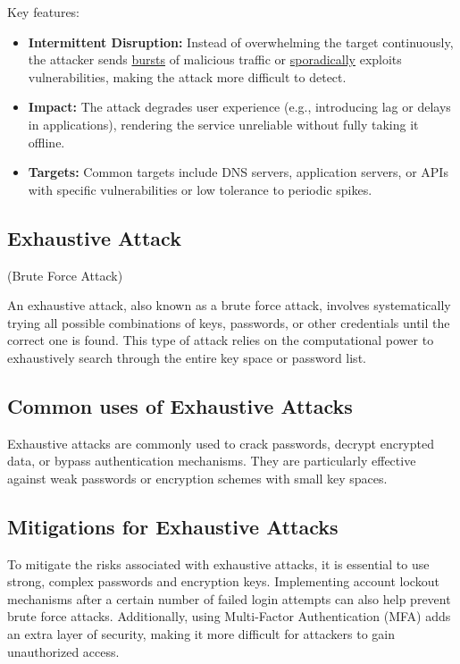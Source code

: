 Key features:
\begin{itemize}
    \item \textbf{Intermittent Disruption:} Instead of overwhelming the target continuously, the attacker sends \underline{bursts} of malicious traffic or \underline{sporadically} exploits vulnerabilities, making the attack more difficult to detect.
    \item \textbf{Impact:} The attack degrades user experience (e.g., introducing lag or delays in applications), rendering the service unreliable without fully taking it offline.
    \item \textbf{Targets:} Common targets include DNS servers, application servers, or APIs with specific vulnerabilities or low tolerance to periodic spikes.
\end{itemize}


\begin{center}
    \section{Exhaustive Attack}
    (Brute Force Attack)
\end{center}

An exhaustive attack, also known as a brute force attack, involves systematically trying all possible combinations of keys, passwords, or other credentials until the correct one is found. This type of attack relies on the computational power to exhaustively search through the entire key space or password list.

\subsection*{Common uses of Exhaustive Attacks}
Exhaustive attacks are commonly used to crack passwords, decrypt encrypted data, or bypass authentication mechanisms. They are particularly effective against weak passwords or encryption schemes with small key spaces.

\subsection*{Mitigations for Exhaustive Attacks}
To mitigate the risks associated with exhaustive attacks, it is essential to use strong, complex passwords and encryption keys. Implementing account lockout mechanisms after a certain number of failed login attempts can also help prevent brute force attacks. Additionally, using Multi-Factor Authentication (MFA) adds an extra layer of security, making it more difficult for attackers to gain unauthorized access.


